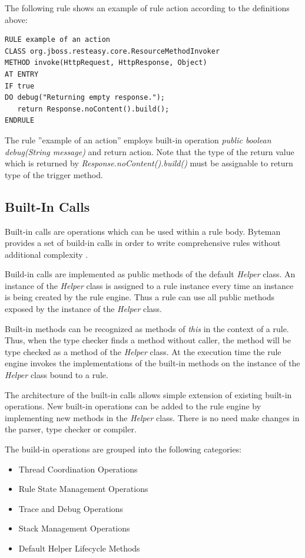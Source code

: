 \documentclass[12pt,oneside]{fithesis2}
\begin{document}
The following rule shows an example of rule action according to the definitions above:
\begin{lstlisting}[caption = Rule Action, label = rule_action_code]
RULE example of an action
CLASS org.jboss.resteasy.core.ResourceMethodInvoker
METHOD invoke(HttpRequest, HttpResponse, Object)
AT ENTRY
IF true
DO debug("Returning empty response.");
   return Response.noContent().build();
ENDRULE
\end{lstlisting}

The rule ''example of an action'' employs built-in operation \textit{public boolean debug(String message)}  and return action. Note that the type of the return value which is returned by \textit{Response.noContent().build()} must be assignable to return type of the trigger method.

\subsection{Built-In Calls}
\label{built-in_calls}
Built-in calls are operations which can be used within a rule body. Byteman provides a set of build-in calls in order to write comprehensive rules without additional complexity \cite[Built-In Calls]{byteman_doc}.

Build-in calls are implemented as public methods of the default \textit{Helper} class. An instance of the \textit{Helper} class is assigned to a rule instance every time an instance is being created by the rule engine. Thus a rule can use all public methods exposed by the instance of the \textit{Helper} class.

Built-in methods can be recognized as methods of \textit{this} in the context of a rule. Thus, when the type checker finds a method without caller, the method will be type checked as a method of the \textit{Helper} class. At the execution time the rule engine invokes the implementations of the built-in methods on the instance of the \textit{Helper} class bound to a rule.

The architecture of the built-in calls allows simple extension of existing built-in operations. New built-in operations can be added to the rule engine by implementing new methods in the \textit{Helper} class. There is no need make changes in the parser,  type checker or compiler.

The build-in operations are grouped into the following categories\cite{byteman_doc}:
\begin{itemize}
	\item	Thread Coordination Operations
	\item	Rule State Management Operations
	\item	Trace and Debug Operations
	\item	Stack Management Operations
	\item	Default Helper Lifecycle Methods
\end{itemize}
 
\end{document}
